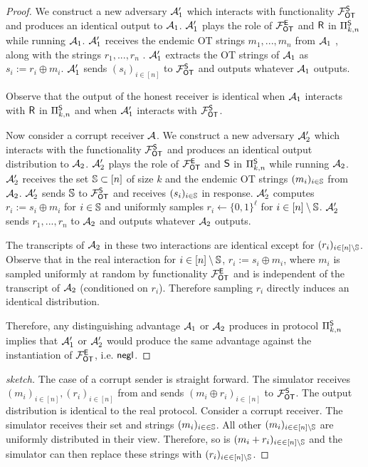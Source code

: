 \iffullversion
\begin{proof}
 We construct a new adversary $\mathcal{A}_1'$ which interacts with functionality $\mathcal{F}_{\mathsf{OT}}^\mathsf{S}$ and produces an identical output  to $\mathcal{A}_1$.  $\mathcal{A}_1'$ plays the role of $\mathcal{F}_{\mathsf{OT}}^\mathsf{E}$ and $\mathsf{R}$ in $\Pi^{\mathsf{S}}_{k,n}$ while running $\mathcal{A}_1$. $\mathcal{A}_1'$ receives the endemic OT strings $m_1,...,m_n$ from $\mathcal{A}_1$%
, along with the strings $r_1,...,r_n$%
.  $\mathcal{A}_1'$ extracts the OT strings of $\mathcal{A}_1$ as $s_i:=r_i\oplus m_i$. $\mathcal{A}_1'$ sends $(s_i)_{i\in [n]}$ to $\mathcal{F}_{\mathsf{OT}}^\mathsf{S}$ and outputs whatever $\mathcal{A}_1$ outputs.
	
	Observe that the output of the honest receiver is identical when $\mathcal{A}_1$ interacts with $\mathsf{R}$ in $\Pi^{\mathsf{S}}_{k,n}$ and when $\mathcal{A}_1'$ interacts with $\mathcal{F}_{\mathsf{OT}}^\mathsf{S}$.
	
	
	
	Now consider a corrupt receiver $\mathcal{A}$. We construct a new adversary $\mathcal{A}_2'$ which interacts with the functionality $\mathcal{F}_{\mathsf{OT}}^\mathsf{S}$ and produces an identical output distribution to $\mathcal{A}_2$. $\mathcal{A}_2'$ plays the role of $\mathcal{F}_{\mathsf{OT}}^\mathsf{E}$ and $\mathsf{S}$ in $\Pi^{\mathsf{S}}_{k,n}$ while running $\mathcal{A}_2$. $\mathcal{A}_2'$ receives the set $\mathsf{\mathbb S}\subset[n]$ of size $k$ and the endemic OT strings $(m_i)_{i\in \mathsf{\mathbb S}}$ from $\mathcal{A}_2$. $\mathcal{A}_2'$ sends $\mathsf{\mathbb S}$ to  $\mathcal{F}_{\mathsf{OT}}^\mathsf{S}$ and receives $(s_i)_{i\in \mathsf{\mathbb S}}$ in response. $\mathcal{A}_2'$ computes $r_i:=s_i\oplus m_i$ for $i\in \mathsf{\mathbb S}$ and uniformly samples $r_i\gets \{0,1\}^\ell$ for $i\in [n]\setminus \mathsf{\mathbb S}$. $\mathcal{A}_2'$ sends $r_1,...,r_n$ to $\mathcal{A}_2$ and outputs whatever $\mathcal{A}_2$ outputs.

	The transcripts of $\mathcal{A}_2$ in these two interactions are identical except for $(r_i)_{i\in [n]\setminus \mathsf{\mathbb S}}$. Observe that in the real interaction for $i\in [n]\setminus\mathsf{\mathbb S}$, $r_i:=s_i\oplus m_i$, where $m_i$ is sampled uniformly at random  by functionality $\mathcal{F}_{\mathsf{OT}}^\mathsf{E}$ and is independent of the transcript of $\mathcal{A}_2$ (conditioned on $r_i$). Therefore sampling $r_i$ directly induces an identical distribution. 
	
	Therefore, any distinguishing advantage $\mathcal{A}_1$ or $\mathcal{A}_2$ produces in protocol $\Pi^{\mathsf{S}}_{k,n}$ implies that $\mathcal{A}_1'$ or $\mathcal{A}_2'$ would produce the same advantage against the instantiation of $\mathcal{F}_{\mathsf{OT}}^\mathsf{E}$, i.e. $\mathsf{negl}$.
\end{proof}
\else
\begin{proof}[sketch]	
	The case of a corrupt sender is straight forward. The simulator receives $(m_i)_{i\in[n]},(r_i)_{i\in[n]}$ from \rec and sends $(m_i\oplus r_i)_{i\in[n]}$ to $\mathcal{F}_{\mathsf{OT}}^\mathsf{S}$. The output distribution is identical to the real protocol. Consider a corrupt receiver. The simulator receives their set and strings $(m_i)_{i\in\in{\ensuremath{\mathsf{\mathbb S}}}}$. All other $(m_i)_{i\in\in{[n]\setminus\ensuremath{\mathsf{\mathbb S}}}}$ are uniformly distributed in their view. Therefore, so is $(m_i+r_i)_{i\in\in{[n]\setminus\ensuremath{\mathsf{\mathbb S}}}}$ and the simulator can then replace these strings with $(r_i)_{i\in\in{[n]\setminus\ensuremath{\mathsf{\mathbb S}}}}$.
\pe
\end{proof}
\fi

